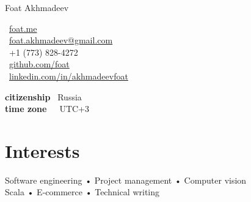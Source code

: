 \documentclass[10pt, a4paper]{article}
\makeatletter
\def\myauthor{Foat Akhmadeev}
\def\myphone{+1 (773) 828-4272}
\def\myemail{foat.akhmadeev@gmail.com}
\def\mygithub{github.com/foat}
\def\mylinkedin{linkedin.com/in/akhmadeevfoat}
\def\myhomesite{foat.me}
\def\mycitizenship{Russia}
\def\mytimezone{UTC+3}
\makeatother
\begin{document}
{\LARGE \myauthor}\\[1cm]
\begin{minipage}[t]{2in}
\end{minipage}
\begin{minipage}[t]{2in}
\flushleft
\faHome \, \href{http://\myhomesite}{\myhomesite}\\
\faEnvelope \, \href{mailto:\myemail}{\myemail}\\
\faPhone \, \myphone\\
\faGithub \, \href{https://\mygithub}{\mygithub}\\
\faLinkedin \, \href{https://\mylinkedin}{\mylinkedin}\\
\end{minipage}
\begin{minipage}[t]{3in}
\flushleft
\textbf{citizenship} \, \mycitizenship\\
\textbf{time zone}\, \, \, \mytimezone\\
\end{minipage}

\section*{Interests}
Software engineering • Project management • Computer vision \\
Scala • E-commerce • Technical writing
\end{document}
